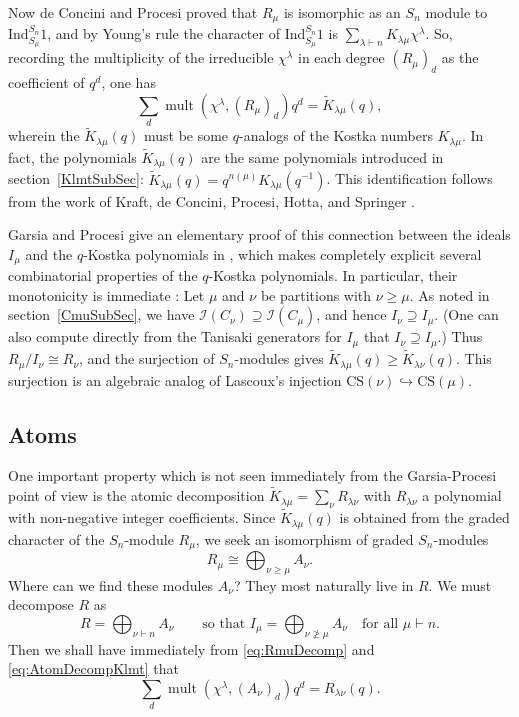 \documentclass[12pt]{article}
\newcommand{\isom}{\cong}
\newcommand{\la}{{\lambda}}
\newcommand{\ptn}{\vdash}
\newcommand{\Klm}{K_{\la \mu}}
\newcommand{\Klmt}{\tilde{K}_{\la \mu}}
\newcommand{\Klt}[1]{\tilde{K}_{\la {#1}}}
\newcommand{\Ind}{\text{Ind}}
\newcommand{\inject}{\hookrightarrow}
\newcommand{\CSm}{\text{CS}(\mu)}
\newcommand{\CS}[1]{\text{CS}(#1)}
\newcommand{\bigdsum}{\bigoplus}
\newcommand{\I}{{\mathcal{I}}}
\newcommand{\Sn}{S_{n}}
\newcommand{\Cmu}{C_{\mu}}
\newcommand{\Rmu}{R_{\mu}}
\newcommand{\Imu}{I_{\mu}}
\newcommand{\mult}{\operatorname{mult}}
\numberwithin{equation}{section}
\theoremstyle{plain}
\theoremstyle{definition}
\theoremstyle{remark}
\begin{document}
Now de Concini and Procesi \cite{deConcini&Procesi} proved that
$R_{\mu}$ is isomorphic as an $\Sn$ module to $\Ind_{S_{\mu}}^{\Sn}
1$, and by Young's rule the character of ${\Ind_{S_{\mu}}^{\Sn}1}$ is
$\sum_{\la\ptn n}\Klm \chi^{\la}$.  So, recording the multiplicity of
the irreducible $\chi^{\la}$ in each degree $(R_{\mu})_{d}$ as the
coefficient of $q^d$, one has
\begin{equation}
\sum _{d} \mult (\chi ^{\lambda }, (\Rmu)_{d}) q^{d} = \Klmt(q),
\end{equation}
wherein the $\Klmt(q)$ must be some $q$-analogs of the Kostka numbers
$\Klm$.   In
fact, the polynomials $\Klmt(q)$ are the same polynomials introduced
in section~\ref{KlmtSubSec}: 
$\Klmt(q) = q^{n(\mu)} \Klm(q^{-1})$.
This identification follows from the work of Kraft, de
Concini, Procesi, Hotta, and Springer 
\cite{Kraft, deConcini&Procesi, Springer76, Springer78, Hotta&Springer}.

Garsia and Procesi give an elementary proof of this connection between
the ideals $\Imu$ and the $q$-Kostka polynomials in
\cite{Garsia&Procesi}, which makes completely explicit several
combinatorial properties of the $q$-Kostka polynomials.  In
particular, their monotonicity is immediate
\cite[p. 103]{Garsia&Procesi}: Let $\mu$ and $\nu$ be partitions with
$\nu\geq\mu$.  As noted in section~\ref{CmuSubSec}, we have
$\I(C_{\nu})\supseteq \I(\Cmu)$, and hence $I_{\nu}\supseteq \Imu$.  (One
can also compute directly from the Tanisaki generators for $\Imu$ that
$I_{\nu}\supseteq \Imu$.)  Thus $R_{\mu}/I_{\nu}\isom R_{\nu}$, and
the surjection of $\Sn$-modules gives $\Klmt(q)\geq\Klt{\nu}(q)$.  This
surjection is an algebraic analog of Lascoux's injection
$\CS{\nu}\inject\CSm$. 

\subsection{Atoms}
One important property which is not seen immediately from the
Garsia-Procesi point of view is the atomic decomposition
$\Klmt=\sum_{\nu} R_{\la\nu}$ with $R_{\la\nu}$ a polynomial with
non-negative integer coefficients.  Since $\Klmt(q)$ is obtained from
the graded character of the $\Sn$-module $R_{\mu}$, we seek an
isomorphism of graded $\Sn$-modules
\begin{equation}\label{eq:RmuDecomp}
R_{\mu}\isom\bigdsum_{\nu\geq\mu}A_{\nu}.
\end{equation}  
Where can we find these modules $A_{\nu}$?  They most naturally live in $R$.
We must decompose $R$ as 
\begin{equation} \label{decompR}
R = \bigdsum_{\nu\ptn n} A_{\nu}			    
\qquad\text{so that }
I_{\mu} = \bigdsum_{\nu\not\geq\mu} A_{\nu}\quad \text{for all }
\mu\ptn n.
\end{equation}
Then we shall have immediately from \eqref{eq:RmuDecomp} and
\eqref{eq:AtomDecompKlmt} that 
\begin{equation}
\sum _{d} \mult (\chi ^{\lambda },
(A_{\nu })_{d}) q^{d} = R_{\la\nu}(q).
\end{equation}
\end{document}

